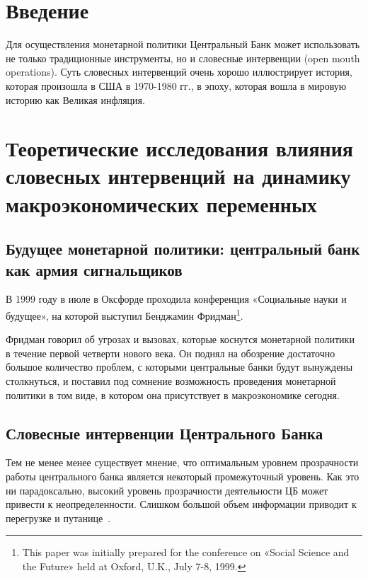 \documentclass[12pt, a4paper, oneside]{extreport}
\begin{document}


\tableofcontents  %


\chapter*{Введение}


Для осуществления монетарной политики Центральный Банк может использовать не только традиционные инструменты, но и словесные интервенции (open mouth operations). Суть словесных интервенций очень хорошо иллюстрирует история, которая произошла в США в 1970-1980 гг., в эпоху, которая вошла в мировую историю как Великая инфляция.


\chapter{Теоретические исследования влияния словесных интервенций на динамику макроэкономических переменных}

\section{Будущее монетарной политики: центральный банк как армия сигнальщиков}

В 1999 году в июле в Оксфорде проходила конференция «Социальные науки и будущее», на которой выступил Бенджамин Фридман\footnote{This paper was initially prepared for the conference on «Social Science and the Future» held at Oxford, U.K., July 7-8, 1999.}.

Фридман говорил об угрозах и вызовах, которые коснутся монетарной политики в течение первой четверти нового века. Он поднял на обозрение достаточно большое количество проблем, с которыми  центральные банки будут вынуждены столкнуться, и поставил под сомнение возможность проведения монетарной политики в том виде, в котором она присутствует в макроэкономике сегодня.

\section{Словесные интервенции Центрального Банка}

Тем не менее менее существует мнение, что оптимальным уровнем прозрачности работы центрального банка является некоторый промежуточный уровень. Как это ни парадоксально, высокий уровень прозрачности деятельности ЦБ может привести к неопределенности.  Слишком большой объем информации приводит к перегрузке и путанице~\cite{morris2005central}.
\end{document}
